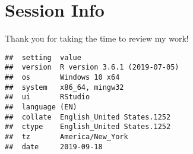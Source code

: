 \documentclass[]{article}
\begin{document}
\hypertarget{session-info}{%
\section{Session Info}\label{session-info}}

Thank you for taking the time to review my work!

\begin{verbatim}
##  setting  value                       
##  version  R version 3.6.1 (2019-07-05)
##  os       Windows 10 x64              
##  system   x86_64, mingw32             
##  ui       RStudio                     
##  language (EN)                        
##  collate  English_United States.1252  
##  ctype    English_United States.1252  
##  tz       America/New_York            
##  date     2019-09-18
\end{verbatim}
\end{document}
